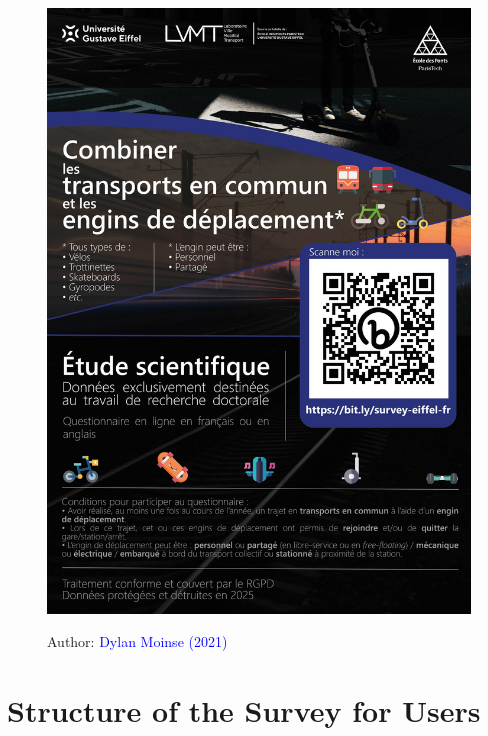     \begin{figure}[H]\vspace*{4pt}
        \caption*{}
        \centerline{\includegraphics[width=1\columnwidth]{src/Figures/Chap-3/FR_Affiche_Questionnaire.jpg}}
        \vspace{5pt}
        \begin{flushright}\scriptsize{
        Author: \textcolor{blue}{Dylan Moinse (2021)}
        }\end{flushright}
    \end{figure}

    \newpage
    \newpage
\section{Structure of the Survey for Users}
    \label{annexes:structure-questionnaire-usagers}

